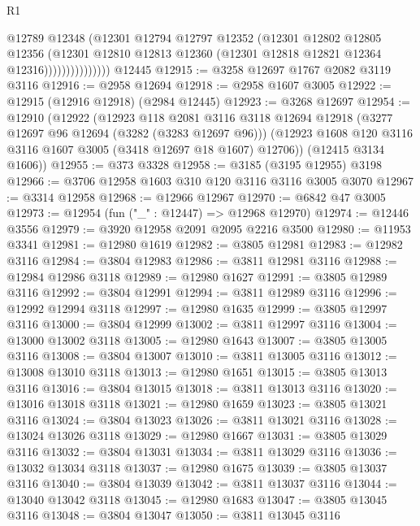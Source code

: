 \begin{lexlean}{R1}
\begin{coremodule}
                          @12789
                          @12348
                          (@12301
                            @12794
                            @12797
                            @12352
                            (@12301
                              @12802
                              @12805
                              @12356
                              (@12301
                                @12810
                                @12813
                                @12360
                                (@12301 @12818 @12821 @12364 @12316)))))))))))))))
    @12445
@12915 := @3258 @12697 @1767 @2082 @3119 @3116
@12916 := @2958 @12694
@12918 := @2958 @1607 @3005
@12922 := @12915 (@12916 @12918) (@2984 @12445)
@12923 := @3268 @12697
@12954 := @12910
    (@12922
      (@12923
        @118
        @2081
        @3116
        @3118
        @12694
        @12918
        (@3277 @12697 @96 @12694 (@3282 (@3283 @12697 @96)))
        (@12923 @1608 @120 @3116 @3116 @1607 @3005 (@3418 @12697 @18 @1607) @12706))
      (@12415 @3134 @1606))
@12955 := @373 @3328
@12958 := @3185 (@3195 @12955) @3198
@12966 := @3706 @12958 @1603 @310 @120 @3116 @3116 @3005 @3070
@12967 := @3314 @12958
@12968 := @12966 @12967
@12970 := @6842 @47 @3005
@12973 := @12954 (fun ("_" : @12447) => @12968 @12970)
@12974 := @12446 @3556
@12979 := @3920 @12958 @2091 @2095 @2216 @3500
@12980 := @11953 @3341
@12981 := @12980 @1619
@12982 := @3805 @12981
@12983 := @12982 @3116
@12984 := @3804 @12983
@12986 := @3811 @12981 @3116
@12988 := @12984 @12986 @3118
@12989 := @12980 @1627
@12991 := @3805 @12989 @3116
@12992 := @3804 @12991
@12994 := @3811 @12989 @3116
@12996 := @12992 @12994 @3118
@12997 := @12980 @1635
@12999 := @3805 @12997 @3116
@13000 := @3804 @12999
@13002 := @3811 @12997 @3116
@13004 := @13000 @13002 @3118
@13005 := @12980 @1643
@13007 := @3805 @13005 @3116
@13008 := @3804 @13007
@13010 := @3811 @13005 @3116
@13012 := @13008 @13010 @3118
@13013 := @12980 @1651
@13015 := @3805 @13013 @3116
@13016 := @3804 @13015
@13018 := @3811 @13013 @3116
@13020 := @13016 @13018 @3118
@13021 := @12980 @1659
@13023 := @3805 @13021 @3116
@13024 := @3804 @13023
@13026 := @3811 @13021 @3116
@13028 := @13024 @13026 @3118
@13029 := @12980 @1667
@13031 := @3805 @13029 @3116
@13032 := @3804 @13031
@13034 := @3811 @13029 @3116
@13036 := @13032 @13034 @3118
@13037 := @12980 @1675
@13039 := @3805 @13037 @3116
@13040 := @3804 @13039
@13042 := @3811 @13037 @3116
@13044 := @13040 @13042 @3118
@13045 := @12980 @1683
@13047 := @3805 @13045 @3116
@13048 := @3804 @13047
@13050 := @3811 @13045 @3116

\end{coremodule}
\end{lexlean}
